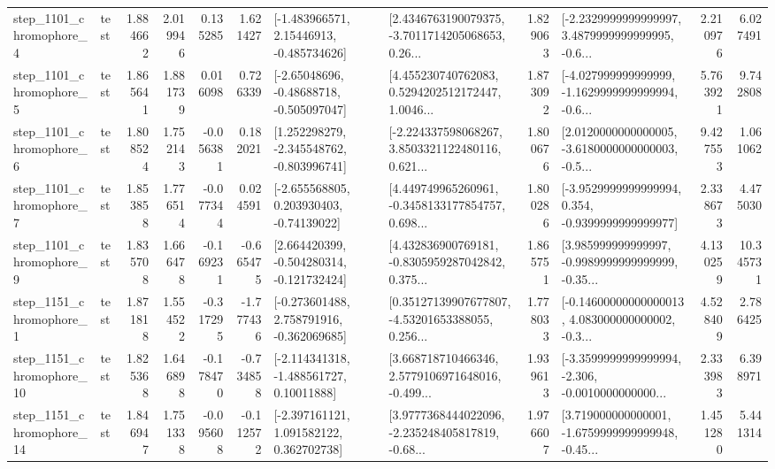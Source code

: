 \begin{tabular}{llrrrrllrlrr}
  step\_1101\_chromophore\_4 &      test &      1.884662 &    2.019946 &      0.135285 &  1.621427 &    [-1.483966571, 2.15446913, -0.485734626] &  [2.4346763190079375, -3.7011714205068653, 0.26... &       1.829063 &  [-2.2329999999999997, 3.4879999999999995, -0.6... &            2.210976 &          6.027491 \\
  step\_1101\_chromophore\_5 &      test &      1.865641 &    1.881739 &      0.016098 &  0.726339 &    [-2.65048696, -0.48688718, -0.505097047] &  [4.455230740762083, 0.5294202512172447, 1.0046... &       1.873092 &  [-4.027999999999999, -1.1629999999999994, -0.6... &            5.763921 &          9.742808 \\
  step\_1101\_chromophore\_6 &      test &      1.808524 &    1.752143 &     -0.056381 &  0.182021 &   [1.252298279, -2.345548762, -0.803996741] &  [-2.224337598068267, 3.8503321122480116, 0.621... &       1.800676 &  [2.0120000000000005, -3.6180000000000003, -0.5... &            9.427553 &          1.061062 \\
  step\_1101\_chromophore\_7 &      test &      1.853858 &    1.776514 &     -0.077344 &  0.024591 &    [-2.655568805, 0.203930403, -0.74139022] &  [4.449749965260961, -0.3458133177854757, 0.698... &       1.800286 &  [-3.9529999999999994, 0.354, -0.9399999999999977] &            2.338673 &          4.475030 \\
  step\_1101\_chromophore\_9 &      test &      1.835708 &    1.666478 &     -0.169231 & -0.665475 &   [2.664420399, -0.504280314, -0.121732424] &  [4.432836900769181, -0.8305959287042842, 0.375... &       1.865751 &  [3.985999999999997, -0.9989999999999999, -0.35... &            4.130259 &         10.345731 \\
  step\_1151\_chromophore\_1 &      test &      1.871818 &    1.554522 &     -0.317295 & -1.777436 &   [-0.273601488, 2.758791916, -0.362069685] &  [0.35127139907677807, -4.53201653388055, 0.256... &       1.778033 &  [-0.14600000000000013, 4.083000000000002, -0.3... &            4.528409 &          2.786425 \\
 step\_1151\_chromophore\_10 &      test &      1.825368 &    1.646898 &     -0.178470 & -0.734858 &    [-2.114341318, -1.488561727, 0.10011888] &  [3.668718710466346, 2.5779106971648016, -0.499... &       1.939613 &  [-3.3599999999999994, -2.306, -0.0010000000000... &            2.333983 &          6.398971 \\
 step\_1151\_chromophore\_14 &      test &      1.846947 &    1.751338 &     -0.095608 & -0.112572 &    [-2.397161121, 1.091582122, 0.362702738] &  [3.9777368444022096, -2.235248405817819, -0.68... &       1.976607 &  [3.719000000000001, -1.6759999999999948, -0.45... &            1.451280 &          5.441314 \\

\end{tabular}
